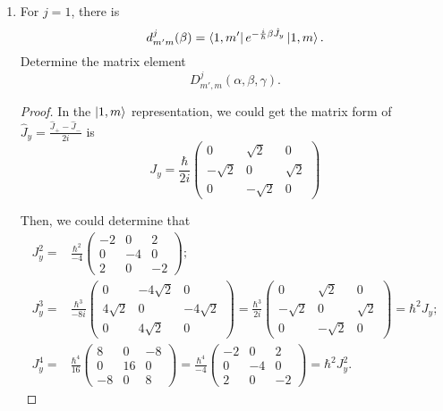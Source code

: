 \documentclass[reqno,a4paper,12pt]{amsart}
\begin{document}
\begin{enumerate}[1.]
\begin{proof}
	The top row of the table is $\{J, M\}$ and the left column of the table is $\{m_1,m_2\}$.
\end{proof}
\medskip

\item For $j=1$, there is 
\[
	d_{m'm}^j (\beta) = \bra{1,m'} e^{-\frac{i}{\hbar} \beta \hat{J}_y} \ket{1,m}.
\]
Determine the matrix element 
\[
	D_{m',m}^j (\alpha, \beta, \gamma).
\]

\begin{proof}
In the $\ket{1,m}$ representation, we could get the matrix form of $\hat{J}_y = \frac{\hat{J}_+ - \hat{J}_-}{2i}$ is 
\[
	J_y = \frac{\hbar}{2i} \left( \begin{matrix}
		0 & \sqrt{2} & 0 \\
		-\sqrt{2} & 0 & \sqrt{2} \\
		0 & -\sqrt{2} & 0
	\end{matrix} \right)
\]

Then, we could determine that 
\begin{align*}
	J_y^2 =& \frac{\hbar^2}{-4} \left( \begin{matrix}
		-2 & 0 & 2 \\
		0 & -4 & 0 \\
		2 & 0 & -2
	\end{matrix} \right); \\
	J_y^3 =& \frac{\hbar^3}{-8i} \left( \begin{matrix}
		0 & -4\sqrt{2} & 0 \\
		4\sqrt{2} & 0 & -4\sqrt{2} \\
		0 & 4\sqrt{2} & 0
	\end{matrix} \right) = \frac{\hbar^3}{2i} \left( \begin{matrix}
		0 & \sqrt{2} & 0 \\
		-\sqrt{2} & 0 & \sqrt{2} \\
		0 & -\sqrt{2} & 0
	\end{matrix} \right) = \hbar^2 J_y; \\
	J_y^4 =& \frac{\hbar^4}{16} \left( \begin{matrix}
		8 & 0 & -8 \\
		0 & 16 & 0 \\
		-8 & 0 & 8
	\end{matrix} \right) = \frac{\hbar^4}{-4} \left( \begin{matrix}
		-2 & 0 & 2 \\
		0 & -4 & 0 \\
		2 & 0 & -2
	\end{matrix} \right) = \hbar^2 J_y^2.
\end{align*}


\end{proof}
\end{enumerate}
\end{document}
